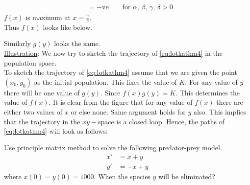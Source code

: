 \documentclass[../main-sheet.tex]{subfiles}
\begin{document}
\begin{soln}
\begin{align*}
        &=-\text{ve}\qquad \text{for }\alpha,\,\beta,\,\gamma,\,\delta>0
     \end{align*}
     \(f(x)\) is maximum at \(x=\frac{\gamma}{\delta}\).\\
     Thus \(f(x)\) looks like below.
\begin{figure}[H]
    \centering
\end{figure}
     Similarly \(g(y)\) looks the same.\\

     \underline{Illustration}: We now try to sketch the trajectory of \eqref{eq:lotkathm4} in the population space.\\
     To sketch the trajectory of \eqref{eq:lotkathm4} assume that we are given the point \((x_0,y_0)\) as the initial population. This fixes the value of \(K\). For any value of \(y\) there will be one value of \(g(y)\). Since \(f(x)g(y)=K\). This determines the value of \(f(x)\). It is clear from the figure that for any value of \(f(x)\) there are either two values of \(x\) or else none. Same argument holds for \(y\) also. This implies that the trajectory in the \(xy-\)space is a closed loop. Hence, the paths of \eqref{eq:lotkathm4} will look as follows:
     \begin{figure}[H]
        \centering
     \end{figure}
\end{soln}
\begin{prob}
    Use principle matrix method to solve the following predator-prey model.
    \begin{align*}
        x'&=x+y\\
        y'&=-x+y
    \end{align*}
    where \(x(0)=y(0)=1000\). When the species \(y\) will be eliminated?
\end{prob}
\end{document}
